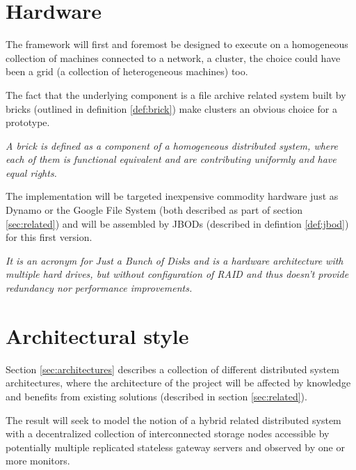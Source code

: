 \section{Hardware} \label{sec:hardware}
The framework will first and foremost be designed to execute on a homogeneous collection of machines connected to a network, \ie a cluster, the choice could have been a grid (a collection of heterogeneous machines) too. 

The fact that the underlying component is a file archive related system built by bricks (outlined in definition \ref{def:brick}) make clusters an obvious choice for a prototype.

\vspace*{3mm}
\begin{definition}[Brick] \label{def:brick}
\textit{A brick is defined as a component of a homogeneous distributed system, where each of them is functional equivalent and are contributing uniformly and have equal rights.}
\end{definition}
\vspace*{3mm}

The implementation will be targeted inexpensive commodity hardware just as \eg Dynamo or the Google File System (both described as part of section \ref{sec:related}) and will be assembled by JBODs (described in defintion \ref{def:jbod}) for this first version.

\vspace*{3mm}
\begin{definition}[JBOD] \label{def:jbod}
\textit{It is an acronym for Just a Bunch of Disks and is a hardware architecture with multiple hard drives, but without configuration of RAID and thus doesn't provide redundancy nor performance improvements.}
\end{definition}


\section{Architectural style}
Section \ref{sec:architectures} describes a collection of different distributed system architectures\cite{Tanenbaum:2006:DSP:1202502}, where the architecture of the project will be affected by knowledge and benefits from existing solutions (described in section \ref{sec:related}). 
\newline

The result will seek to model the notion of a hybrid related distributed system with a decentralized collection of interconnected storage nodes accessible by potentially multiple replicated stateless gateway servers and observed by one or more monitors.

